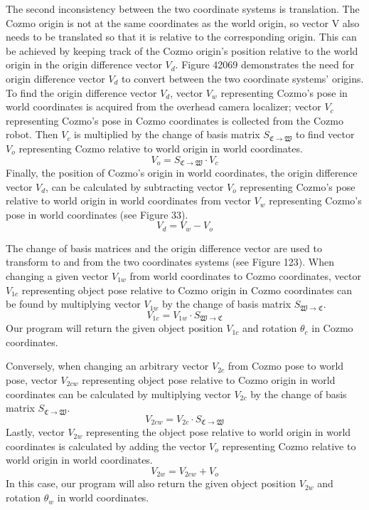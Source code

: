 \documentclass[jou,apacite]{apa6}
\begin{document}
The second inconsistency between the two coordinate systems is translation. The Cozmo origin is not at the same coordinates as the world origin, so vector V also needs to be translated so that it is relative to the corresponding origin. This can be achieved by keeping track of the Cozmo origin’s position relative to the world origin in the origin difference vector $V_d$. Figure 42069 demonstrates the need for origin difference vector $V_d$ to convert between the two coordinate systems’ origins. To find the origin difference vector $V_d$, vector $V_w$ representing Cozmo's pose in world coordinates is acquired from the overhead camera localizer; vector $V_c$ representing Cozmo’s pose in Cozmo coordinates is collected from the Cozmo robot. Then $V_c$ is multiplied by the change of basis matrix $S_{\mathfrak{C}\rightarrow\mathfrak{W}}$ to find vector $V_o$ representing Cozmo relative to world origin in world coordinates.
$$V_o = S_{\mathfrak{C}\rightarrow\mathfrak{W}} \cdot V_c$$
Finally, the position of Cozmo’s origin in world coordinates, the origin difference vector $V_d$, can be calculated by subtracting vector $V_o$ representing Cozmo’s pose relative to world origin in world coordinates from vector $V_w$ representing Cozmo’s pose in world coordinates (see Figure 33). 
$$V_d = V_w - V_o$$

The change of basis matrices and the origin difference vector are used to transform to and from the two coordinates systems (see Figure 123). When changing a given vector $V_{1w}$ from world coordinates to Cozmo coordinates, vector $V_{1c}$ representing object pose relative to Cozmo origin in Cozmo coordinates can be found by multiplying vector $V_{1w}$ by the  change of basis matrix $S_{\mathfrak{W}\rightarrow\mathfrak{C}}$.
$$V_{1c} = V_{1w} \cdot S_{\mathfrak{W}\rightarrow\mathfrak{C}}$$
Our program will return the given object position $V_{1c}$ and rotation $\theta_c$ in Cozmo coordinates.

Conversely, when changing an arbitrary vector $V_{2c}$ from Cozmo pose to world pose, vector $V_{2cw}$ representing object pose relative to Cozmo origin in world coordinates can be calculated by multiplying vector $V_{2c}$ by the  change of basis matrix $S_{\mathfrak{C}\rightarrow\mathfrak{W}}$.
$$V_{2cw} = V_{2c} \cdot S_{\mathfrak{C}\rightarrow\mathfrak{W}}$$
Lastly, vector $V_{2w}$ representing the object pose relative to world origin in world coordinates is calculated by adding the vector $V_o$ representing Cozmo relative to world origin in world coordinates.
$$V_{2w} = V_{2cw} + V_o$$
In this case, our program will also return the given object position $V_{2w}$ and rotation $\theta_w$ in world coordinates.
\end{document}
